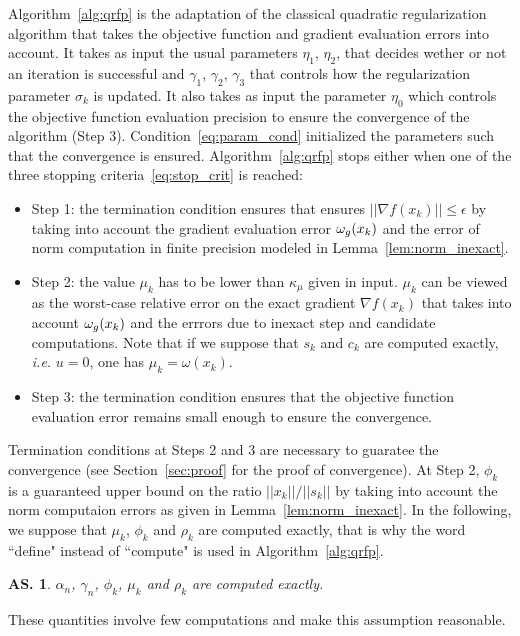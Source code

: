 \documentclass{article}[12pt]
\newtheorem{assumption}[]{\textbf{AS.}}
\begin{document}
	Algorithm~\ref{alg:qrfp} is the adaptation of the classical quadratic regularization algorithm that takes the objective function and gradient evaluation errors into account. It takes as input the usual parameters $\eta_1$, $\eta_2$, that decides wether or not an iteration is successful and $\gamma_1$, $\gamma_2$, $\gamma_3$ that controls how the regularization parameter $\sigma_k$ is updated. It also takes as input the parameter $\eta_0$ which controls the objective function evaluation precision to ensure the convergence of the algorithm (Step 3). Condition~\eqref{eq:param_cond} initialized the parameters such that the convergence is ensured. Algorithm~\ref{alg:qrfp} stops either when one of the three stopping criteria~\eqref{eq:stop_crit} is reached:
	\begin{itemize}
		\item Step 1: the termination condition ensures that ensures $||\nabla f(x_k)||\leq \epsilon$ by taking into account the gradient evaluation error $\omega_g(x_k)$ and the error of norm computation in finite precision modeled in Lemma~\ref{lem:norm_inexact}.
		\item Step 2: the value $\mu_k$ has to be lower than $\kappa_\mu$ given in input. $\mu_k$ can be viewed as the worst-case relative error on the exact gradient $\nabla f(x_k)$ that takes into account $\omega_g(x_k)$ and the errrors due to inexact step and candidate computations. Note that if we suppose that $s_k$ and $c_k$ are computed exactly, \emph{i.e.} $u = 0$, one has $\mu_k = \omega(x_k)$.
		\item Step 3: the termination condition ensures that the objective function evaluation error remains small enough to ensure the convergence.
	\end{itemize}
	Termination conditions at Steps 2 and 3 are necessary to guaratee the convergence (see Section~\ref{sec:proof} for the proof of convergence).
	At Step 2, $\phi_k$ is a guaranteed upper bound on the ratio $||x_k||/||s_k||$ by taking into account the norm computaion errors as given in Lemma~\ref{lem:norm_inexact}. In the following, we suppose that $\mu_k$, $\phi_k$ and $\rho_k$ are computed exactly, that is why the word ``define" instead of ``compute" is used in Algorithm~\ref{alg:qrfp}. 
	\begin{assumption}
		$\alpha_n$, $\gamma_n$, $\phi_k$, $\mu_k$ and $\rho_k$ are computed exactly.
	\end{assumption}
	These quantities involve few computations and make this assumption reasonable.
	
\end{document}
